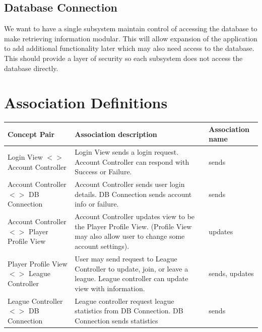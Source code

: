 \subsection{Database Connection}
We want to have a single subsystem maintain control of accessing the database
to make retrieving information modular. This will allow expansion of the
application to add additional functionality later which may also need access
to the database. This should provide a layer of security so each subsystem does
not access the database directly.\\

\newpage
\section{Association Definitions}

\begin{centering}
\renewcommand\arraystretch{1.3}
\label{UC-3}
\begin{longtable}{|p{1.75in}| p{3in}| p{1.75in} |}
\hline
\bfseries{\color{color1}Concept Pair} &
          \bfseries{\color{color1}Association description} &
          \bfseries{\color{color1}Association name} \\ \hline

           Login View $<>$ Account Controller &
           Login View sends a login request. Account Controller can respond with Success
           or Failure. &
           sends \\ \hline

           Account Controller $<>$ DB Connection
           & Account Controller sends user login details. DB Connection sends account
           info or failure.
           & sends \\ \hline

           Account Controller $<>$ Player Profile View
           & Account Controller updates view to be the Player Profile View. (Profile
           View may also allow user to change some account settings).
           & updates \\ \hline

           Player Profile View $<>$ League Controller
           & User may send request to League Controller to update, join, or leave a league.
           League controller can update view with information.
           & sends, updates \\ \hline

           League Controller $<>$ DB Connection
           & League controller request league statistics from DB Connection. DB Connection
           sends statistics
           & sends \\ \hline


\end{longtable}
\end{centering}
